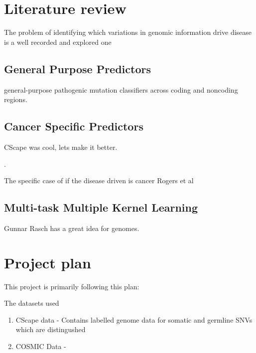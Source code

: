 \documentclass[11pt]{article}
\begin{document}
\section{Literature review}


The problem of identifying which variations in genomic information drive disease is a well recorded and explored one



\subsection{General Purpose Predictors}

general-purpose pathogenic mutation classifiers across coding and noncoding regions.
\cite{Quang2015,Kircher2014}

\subsection{Cancer Specific Predictors}

CScape was cool, lets make it better.

 \cite{Rogers2017,Quang2015,Shihab2013}. 

The specific case of if the disease driven is cancer
Rogers et al \cite{Rogers2017}


\subsection{Multi-task Multiple Kernel Learning}

Gunnar Rasch has a great idea for genomes.
\cite{Widmer2015}

\section{Project plan}

This project is primarily following this plan:

The datasets used
\begin{enumerate}
	\item CScape data \cite{Rogers2017} - Contains labelled genome data for somatic and germline SNVs which are distingushed 
	\item COSMIC Data - 
\end{enumerate}
\end{document}
